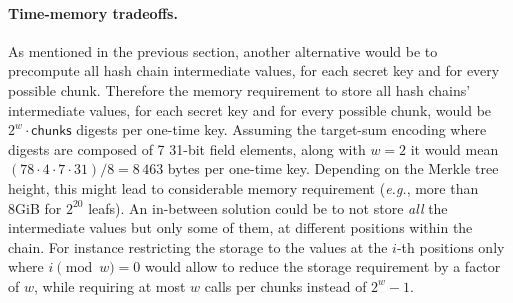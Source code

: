 \paragraph{Time-memory tradeoffs.}
As mentioned in the previous section, another alternative would be to precompute all hash chain intermediate values, for each secret key and for every possible chunk.
Therefore the memory requirement to store all hash chains' intermediate values, for each secret key and for every possible chunk, would be $2^w \cdot \mathsf{chunks}$ digests per one-time key.
Assuming the target-sum encoding where digests are composed of 7 31-bit field elements, along with $w=2$ it would mean $(78 \cdot 4 \cdot 7 \cdot 31)/8 = 8\,463$ bytes per one-time key.
Depending on the Merkle tree height, this might lead to considerable memory requirement (\textit{e.g.}, more than 8GiB for $2^{20}$ leafs).
An in-between solution could be to not store \textit{all} the intermediate values but only some of them, at different positions within the chain.
For instance restricting the storage to the values at the $i$-th positions only where $i \pmod w = 0$ would allow to reduce the storage requirement by a factor of $w$, while requiring at most $w$ \PoseidonTwoPi calls per chunks instead of $2^w-1$.


